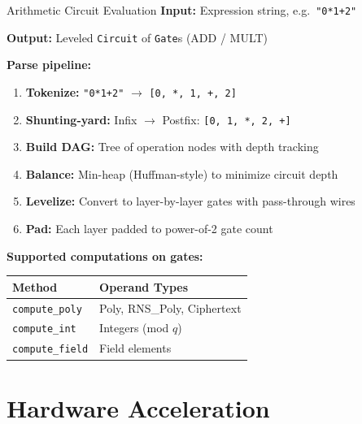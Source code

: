 \documentclass[aspectratio=169, 11pt]{beamer}
\begin{document}
\begin{frame}{Arithmetic Circuit Evaluation}
\textbf{Input:} Expression string, e.g.\ \texttt{"0*1+2"}

\textbf{Output:} Leveled \texttt{Circuit} of \texttt{Gate}s (ADD / MULT)

\vspace{0.5em}
\textbf{Parse pipeline:}
\begin{enumerate}
    \item \textbf{Tokenize:} \texttt{"0*1+2"} $\to$ \texttt{[0, *, 1, +, 2]}
    \item \textbf{Shunting-yard:} Infix $\to$ Postfix: \texttt{[0, 1, *, 2, +]}
    \item \textbf{Build DAG:} Tree of operation nodes with depth tracking
    \item \textbf{Balance:} Min-heap (Huffman-style) to minimize circuit depth
    \item \textbf{Levelize:} Convert to layer-by-layer gates with pass-through wires
    \item \textbf{Pad:} Each layer padded to power-of-2 gate count
\end{enumerate}

\vspace{0.3em}
\textbf{Supported computations on gates:}

\begin{center}
\begin{tabular}{ll}
\toprule
\textbf{Method} & \textbf{Operand Types} \\
\midrule
\texttt{compute\_poly} & Poly, RNS\_Poly, Ciphertext \\
\texttt{compute\_int}  & Integers (mod $q$) \\
\texttt{compute\_field} & Field elements \\
\bottomrule
\end{tabular}
\end{center}
\end{frame}

\section{Hardware Acceleration}
\end{document}
